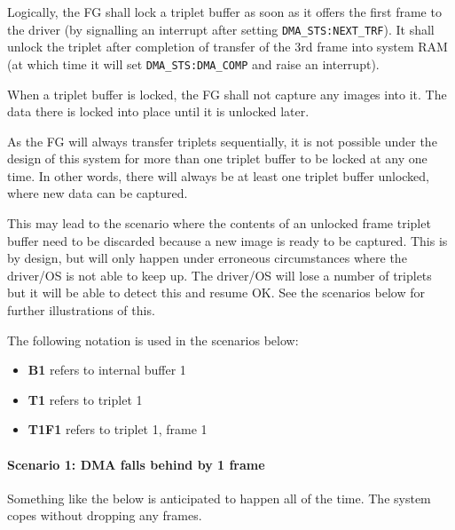 \documentclass[12pt]{article}
\begin{document}
Logically, the FG shall lock a triplet buffer as soon as it offers the first frame to the driver (by signalling an interrupt after setting \texttt{DMA\_STS:NEXT\_TRF}). It shall unlock the triplet after completion of transfer of the 3rd frame into system RAM (at which time it will set \texttt{DMA\_STS:DMA\_COMP} and raise an interrupt).

When a triplet buffer is locked, the FG shall not capture any images into it. The data there is locked into place until it is unlocked later.

As the FG will always transfer triplets sequentially, it is not possible under the design of this system for more than one triplet buffer to be locked at any one time. In other words, there will always be at least one triplet buffer unlocked, where new data can be captured.

This may lead to the scenario where the contents of an unlocked frame triplet buffer need to be discarded because a new image is ready to be captured. This is by design, but will only happen under erroneous circumstances where the driver/OS is not able to keep up. The driver/OS will lose a number of triplets but it will be able to detect this and resume OK. See the scenarios below for further illustrations of this.

The following notation is used in the scenarios below:

\begin{itemize}
\item \textbf{B1} refers to internal buffer 1
\item \textbf{T1} refers to triplet 1
\item \textbf{T1F1} refers to triplet 1, frame 1
\end{itemize}

\paragraph{Scenario 1: DMA falls behind by 1 frame}
Something like the below is anticipated to happen all of the time. The system copes without dropping any frames.
\end{document}
